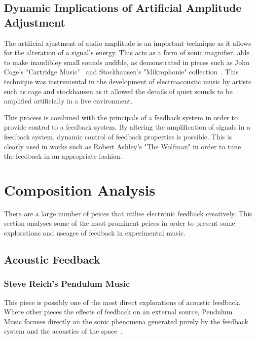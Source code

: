 \documentclass[titlepage]{scrartcl}
\begin{document}
    \subsection{Dynamic Implications of Artificial Amplitude Adjustment}
    The artificial ajustment of audio amplitude is an important technique as it
    allows for the alteration of a signal's energy. This acts as a form of
    sonic magnifier, able to make inaudibley small sounds audible, as
    demonstrated in pieces such as John Cage's "Cartridge
    Music"~\citeyearpar{cage2013cm} and Stockhausen's "Mikrophonie"
    collection~\citeyearpar{stockhausen1995mmt}. This technique was instrumental in the
    development of electroacoustic music by artists such as cage and
    stockhausen as it allowed the details of quiet sounds to be amplified
    artificially in a live environment.~\cite[p.351-352]{holmes2012eaem}

    This process is combined with the principals of a feedback system in order
    to provide control to a feedback system. By altering the amplification of
    signals in a feedback system, dynamic control of feedback properties is
    possible. This is clearly used in works such as Robert Ashley's "The
    Wolfman" in order to tune the feedback in an appropriate
    fashion.~\cite[p.186]{holmes2012eaem}

    \section{Composition Analysis}
    There are a large number of peices that utilise electronic feedback
    creatively. This section analyses some of the most prominent peices in
    order to present some explorations and useages of feedback in experimental
    music.

    \subsection{Acoustic Feedback}

    \subsubsection{Steve Reich's Pendulum Music~\parencite[p.31]{reich2002wom}}\label{pendulum} 
    This piece is possibly one of the most direct explorations of acoustic
    feedback. Where other pieces the effects of feedback on an external source,
    Pendulum Music focuses directly on the sonic phenomena generated purely by
    the feedback system and the acoustics of the space~\parencite[p.50-51]{weisert2010ioi}.
\end{document}
